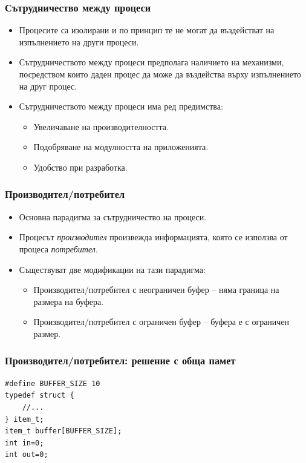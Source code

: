 \documentclass[ignorenonframetext, hyperref=unicode]{beamer}
\begin{document}
\begin{frame}\frametitle{Сътрудничество между процеси}
\begin{itemize}
\item Процесите са изолирани и по принцип те не могат да въздействат на
изпълнението на други процеси.
\item Сътрудничеството между процеси предполага наличието на механизми,
посредством които даден процес да може да въздейства върху изпълнението на друг
процес.
\item Сътрудничеството между процеси има ред предимства:
\begin{itemize}
  \item Увеличаване на производителността.
  \item Подобряване на модулността на приложенията.
  \item Удобство при разработка.
\end{itemize}
\end{itemize}
\end{frame}

\begin{frame}\frametitle{Производител/потребител}
\begin{itemize}
\item Основна парадигма за сътрудничество на процеси.
\item Процесът {\em производител} произвежда информацията, която се използва от
процеса {\em потребител}.
\item Съществуват две модификации на тази парадигма:
\begin{itemize}
  \item Производител/потребител с неограничен буфер -- няма граница на размера
  на буфера.
  \item Производител/потребител с ограничен буфер -- буфера е с ограничен размер.
\end{itemize}
\end{itemize}
\end{frame}

\begin{frame}[containsverbatim]
\frametitle{Производител/потребител: решение с обща памет}
\begin{lstlisting}
#define BUFFER_SIZE 10
typedef struct {
	//...
} item_t;
item_t buffer[BUFFER_SIZE];
int in=0;
int out=0;
\end{lstlisting}
\end{frame}
\end{document}

